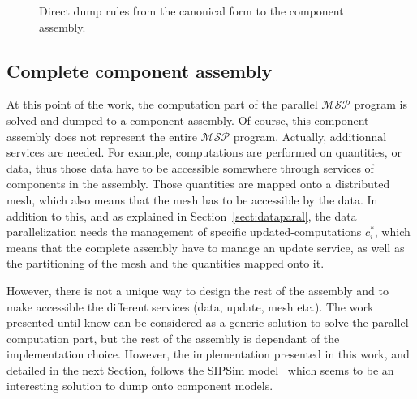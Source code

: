 \begin{figure}[h!]
\begin{center}
\caption{Direct dump rules from the canonical form to the component assembly.}
\label{fig:assembly}
\end{center}
\end{figure}

\subsection{Complete component assembly}
At this point of the work, the computation part of the parallel $\mathcal{MSP}$ program is solved and dumped to a component assembly. Of course, this component assembly does not represent the entire $\mathcal{MSP}$ program. Actually, additionnal services are needed. For example, computations are performed on quantities, or data, thus those data have to be accessible somewhere through services of components in the assembly. Those quantities are mapped onto a distributed mesh, which also means that the mesh has to be accessible by the data. In addition to this, and as explained in Section~\ref{sect:dataparal}, the data parallelization needs the management of specific updated-computations $c_i^*$, which means that the complete assembly have to manage an update service, as well as the partitioning of the mesh and the quantities mapped onto it.

However, there is not a unique way to design the rest of the assembly and to make accessible the different services (data, update, mesh etc.). The work presented until know can be considered as a generic solution to solve the parallel computation part, but the rest of the assembly is dependant of the implementation choice. However, the implementation presented in this work, and detailed in the next Section, follows the SIPSim model~\cite{} which seems to be an interesting solution to dump onto component models.